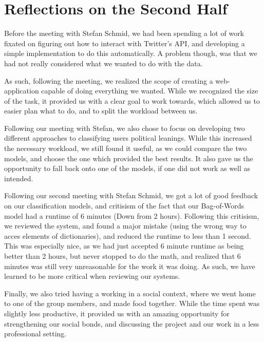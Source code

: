 \section{Reflections on the Second Half}\label{sec:SecRef}
Before the meeting with Stefan Schmid, we had been spending a lot of work
fixated on figuring out how to interact with Twitter's API, and developing a simple
implementation to do this automatically. A problem though, was that we had not
really considered what we wanted to do with the data.\nl

As such, following the meeting, we realized the scope of creating a
web-application capable of doing everything we wanted. While we recognized the
size of the task, it provided us with a clear goal to work towards, which
allowed us to easier plan what to do, and to split the workload between us.\nl  

Following our meeting with Stefan, we also chose to focus on developing two
different approaches to classifying users political leanings. While this
increased the necessary workload, we still found it useful, as we could compare
the two models, and choose the one which provided the best results. It also
gave us the opportunity to fall back onto one of the models, if one did not work
as well as intended.\nl

Following our second meeting with Stefan Schmid, we got a lot of good feedback
on our classification models, and critisism of the fact that our Bag-of-Words
model had a runtime of 6 minutes (Down from 2 hours). Following this critisism,
we reviewed the system, and found a major mistake (using the wrong way to acces
elements of dictionaries), and reduced the runtime to less than 1 second. This
was especially nice, as we had just accepted 6 minute runtime as being better
than 2 hours, but never stopped to do the math, and realized that 6 minutes was
still very unreasonable for the work it was doing. As such, we have learned to
be more critical when reviewing our systems.\nl

Finally, we also tried having a working in a social context, where we went home
to one of the group members, and made food together. While the time spent was
slightly less productive, it provided us with an amazing opportunity for
strengthening our social bonds, and discussing the project and our work in a
less professional setting.